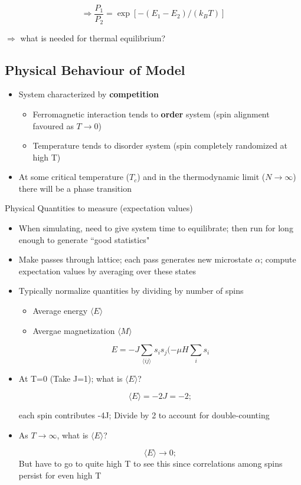 \[ \Rightarrow \frac{P_1}{P_2} = \exp[-(E_1-E_2)/(k_BT)]\]

$\Rightarrow$ what is needed for thermal equilibrium?

\subsection{Physical Behaviour of Model}

\begin{itemize}
    \item System characterized by \textbf{competition}
    \begin{itemize}
        \item Ferromagnetic interaction tends to \textbf{order} system (spin alignment favoured as $T\rightarrow0$)
        \item Temperature tends to disorder system (spin completely randomized at high T)
    \end{itemize}
    \item At some critical temperature ($T_c$) and in the thermodynamic limit ($N\rightarrow\infty$) there will be a phase transition
\end{itemize}

Physical Quantities to measure (expectation values)

\begin{itemize}
    \item When simulating, need to give system time to equilibrate; then run for long enough to generate ``good statistics"
    \item Make passes through lattice; each pass generates new microstate $\alpha$; compute expectation values by averaging over these states
    \item Typically normalize quantities by dividing by number of spins
    \begin{itemize}
        \item Average energy $\langle E \rangle $
        \item Avergae magnetization $\langle M \rangle $
    \end{itemize}

    \[ E = - J \sum_{\langle ij\rangle} s_i s_j (-\mu H \sum_i s_i\]

    \item At T=0 (Take J=1); what is $\langle E \rangle$?

    \[ \langle E \rangle = -2J = -2; \]

    each spin contributes -4J;
    Divide by 2 to account for double-counting

    \item As $T\rightarrow \infty$, what is $\langle E \rangle$?

    \[ \langle E \rangle \rightarrow 0;\]
    But have to go to quite high T to see this since correlations among spins persist for even high T
\end{itemize}

